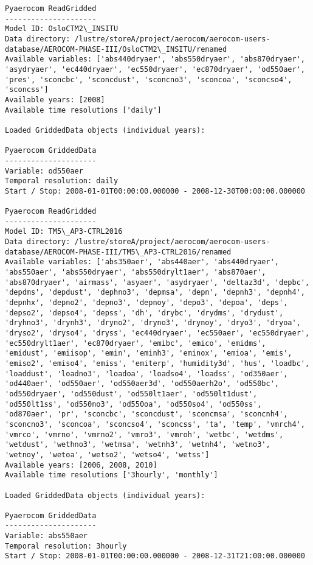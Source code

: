 \documentclass[11pt]{article}
\begin{document}
\begin{Verbatim}[commandchars=\\\{\}]
Pyaerocom ReadGridded
---------------------
Model ID: OsloCTM2\_INSITU
Data directory: /lustre/storeA/project/aerocom/aerocom-users-database/AEROCOM-PHASE-III/OsloCTM2\_INSITU/renamed
Available variables: ['abs440dryaer', 'abs550dryaer', 'abs870dryaer', 'asydryaer', 'ec440dryaer', 'ec550dryaer', 'ec870dryaer', 'od550aer', 'pres', 'sconcbc', 'sconcdust', 'sconcno3', 'sconcoa', 'sconcso4', 'sconcss']
Available years: [2008]
Available time resolutions ['daily']

Loaded GriddedData objects (individual years):

Pyaerocom GriddedData
---------------------
Variable: od550aer
Temporal resolution: daily
Start / Stop: 2008-01-01T00:00:00.000000 - 2008-12-30T00:00:00.000000

Pyaerocom ReadGridded
---------------------
Model ID: TM5\_AP3-CTRL2016
Data directory: /lustre/storeA/project/aerocom/aerocom-users-database/AEROCOM-PHASE-III/TM5\_AP3-CTRL2016/renamed
Available variables: ['abs350aer', 'abs440aer', 'abs440dryaer', 'abs550aer', 'abs550dryaer', 'abs550drylt1aer', 'abs870aer', 'abs870dryaer', 'airmass', 'asyaer', 'asydryaer', 'deltaz3d', 'depbc', 'depdms', 'depdust', 'dephno3', 'depmsa', 'depn', 'depnh3', 'depnh4', 'depnhx', 'depno2', 'depno3', 'depnoy', 'depo3', 'depoa', 'deps', 'depso2', 'depso4', 'depss', 'dh', 'drybc', 'drydms', 'drydust', 'dryhno3', 'drynh3', 'dryno2', 'dryno3', 'drynoy', 'dryo3', 'dryoa', 'dryso2', 'dryso4', 'dryss', 'ec440dryaer', 'ec550aer', 'ec550dryaer', 'ec550drylt1aer', 'ec870dryaer', 'emibc', 'emico', 'emidms', 'emidust', 'emiisop', 'emin', 'eminh3', 'eminox', 'emioa', 'emis', 'emiso2', 'emiso4', 'emiss', 'emiterp', 'humidity3d', 'hus', 'loadbc', 'loaddust', 'loadno3', 'loadoa', 'loadso4', 'loadss', 'od350aer', 'od440aer', 'od550aer', 'od550aer3d', 'od550aerh2o', 'od550bc', 'od550dryaer', 'od550dust', 'od550lt1aer', 'od550lt1dust', 'od550lt1ss', 'od550no3', 'od550oa', 'od550so4', 'od550ss', 'od870aer', 'pr', 'sconcbc', 'sconcdust', 'sconcmsa', 'sconcnh4', 'sconcno3', 'sconcoa', 'sconcso4', 'sconcss', 'ta', 'temp', 'vmrch4', 'vmrco', 'vmrno', 'vmrno2', 'vmro3', 'vmroh', 'wetbc', 'wetdms', 'wetdust', 'wethno3', 'wetmsa', 'wetnh3', 'wetnh4', 'wetno3', 'wetnoy', 'wetoa', 'wetso2', 'wetso4', 'wetss']
Available years: [2006, 2008, 2010]
Available time resolutions ['3hourly', 'monthly']

Loaded GriddedData objects (individual years):

Pyaerocom GriddedData
---------------------
Variable: abs550aer
Temporal resolution: 3hourly
Start / Stop: 2008-01-01T00:00:00.000000 - 2008-12-31T21:00:00.000000


\end{Verbatim}
\end{document}
